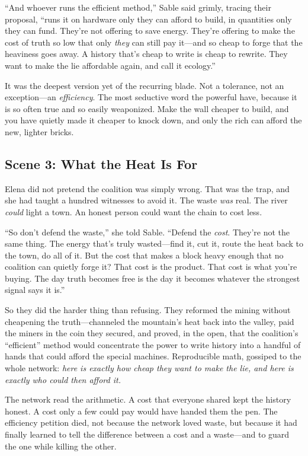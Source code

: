 \documentclass[12pt,letterpaper]{book}
\begin{document}
``And whoever runs the efficient method,'' Sable said grimly, tracing their
proposal, ``runs it on hardware only they can afford to build, in quantities only
they can fund. They're not offering to save energy. They're offering to make the
cost of truth so low that only \emph{they} can still pay it---and so cheap to
forge that the heaviness goes away. A history that's cheap to write is cheap to
rewrite. They want to make the lie affordable again, and call it ecology.''

It was the deepest version yet of the recurring blade. Not a tolerance, not an
exception---an \emph{efficiency}. The most seductive word the powerful have,
because it is so often true and so easily weaponized. Make the wall cheaper to
build, and you have quietly made it cheaper to knock down, and only the rich can
afford the new, lighter bricks.

\hypertarget{scene-3-what-the-heat-is-for}{%
\subsection{Scene 3: What the Heat Is
For}\label{scene-3-what-the-heat-is-for}}

Elena did not pretend the coalition was simply wrong. That was the trap, and she
had taught a hundred witnesses to avoid it. The waste \emph{was} real. The river
\emph{could} light a town. An honest person could want the chain to cost less.

``So don't defend the waste,'' she told Sable. ``Defend the \emph{cost}. They're
not the same thing. The energy that's truly wasted---find it, cut it, route the
heat back to the town, do all of it. But the cost that makes a block heavy enough
that no coalition can quietly forge it? That cost is the product. That cost is what
you're buying. The day truth becomes free is the day it becomes whatever the
strongest signal says it is.''

So they did the harder thing than refusing. They reformed the mining without
cheapening the truth---channeled the mountain's heat back into the valley, paid the
miners in the coin they secured, and proved, in the open, that the coalition's
``efficient'' method would concentrate the power to write history into a handful of
hands that could afford the special machines. Reproducible math, gossiped to the
whole network: \emph{here is exactly how cheap they want to make the lie, and here
is exactly who could then afford it.}

The network read the arithmetic. A cost that everyone shared kept the history
honest. A cost only a few could pay would have handed them the pen. The efficiency
petition died, not because the network loved waste, but because it had finally
learned to tell the difference between a cost and a waste---and to guard the one
while killing the other.
\end{document}
